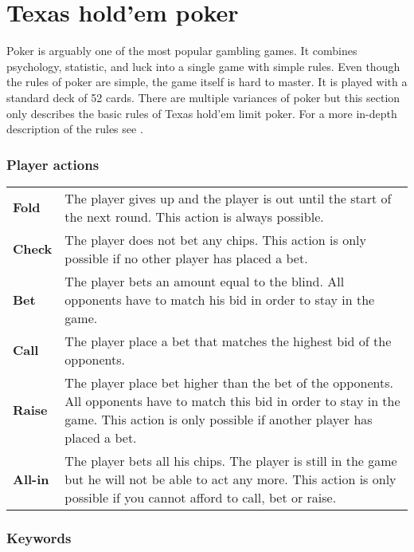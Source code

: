 \section*{Texas hold'em poker}
Poker is arguably one of the most popular gambling games. It combines psychology, statistic, and luck into a single game with simple rules. Even though the rules of poker are simple, the game itself is hard to master. It is played with a standard deck of 52 cards. There are multiple variances of poker but this section only describes the basic rules of Texas hold'em limit poker. For a more in-depth description of the rules see \cite{poker-rules}.

\subsubsection*{Player actions}
\begin{tabular}{ p{0.1\linewidth} p{0.9\linewidth} }
  \textbf{Fold} & The player gives up and the player is out until the start of the next round. This action is always possible.\\
  \textbf{Check} & The player does not bet any chips. This action is only possible if no other player has placed a bet.\\
  \textbf{Bet} & The player bets an amount equal to the blind. All opponents have to match his bid in order to stay in the game.\\
  \textbf{Call} & The player place a bet that matches the highest bid of the opponents.\\
  \textbf{Raise} & The player place bet higher than the bet of the opponents. All opponents have to match this bid in order to stay in the game. This action is only possible if another player has placed a bet.\\
  \textbf{All-in} & The player bets all his chips. The player is still in the game but he will not be able to act any more. This action is only possible if you cannot afford to call, bet or raise.\\
\end{tabular}

\subsubsection*{Keywords}

